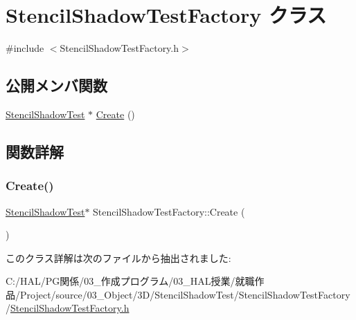\hypertarget{class_stencil_shadow_test_factory}{}\section{Stencil\+Shadow\+Test\+Factory クラス}
\label{class_stencil_shadow_test_factory}


{\ttfamily \#include $<$Stencil\+Shadow\+Test\+Factory.\+h$>$}

\subsection*{公開メンバ関数}
\begin{DoxyCompactItemize}
\item 
\mbox{\hyperlink{class_stencil_shadow_test}{Stencil\+Shadow\+Test}} $\ast$ \mbox{\hyperlink{class_stencil_shadow_test_factory_a4eec5b125ff810267c784c8a922909a2}{Create}} ()
\end{DoxyCompactItemize}


\subsection{関数詳解}
\mbox{\label{class_stencil_shadow_test_factory_a4eec5b125ff810267c784c8a922909a2}} 
\subsubsection{\texorpdfstring{Create()}{Create()}}
{\footnotesize\ttfamily \mbox{\hyperlink{class_stencil_shadow_test}{Stencil\+Shadow\+Test}}$\ast$ Stencil\+Shadow\+Test\+Factory\+::\+Create (\begin{DoxyParamCaption}{ }\end{DoxyParamCaption})\hspace{0.3cm}{\ttfamily [inline]}}



このクラス詳解は次のファイルから抽出されました\+:\begin{DoxyCompactItemize}
\item 
C\+:/\+H\+A\+L/\+P\+G関係/03\+\_\+作成プログラム/03\+\_\+\+H\+A\+L授業/就職作品/\+Project/source/03\+\_\+\+Object/3\+D/\+Stencil\+Shadow\+Test/\+Stencil\+Shadow\+Test\+Factory/\mbox{\hyperlink{_stencil_shadow_test_factory_8h}{Stencil\+Shadow\+Test\+Factory.\+h}}\end{DoxyCompactItemize}
